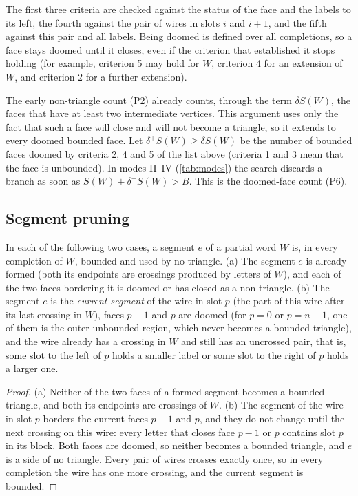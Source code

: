 The first three criteria are checked against the status of the face and the labels to its left, the fourth against the pair of wires in slots $i$ and $i+1$, and the fifth against this pair and all labels.
Being doomed is defined over all completions, so a face stays doomed until it closes, even if the criterion that established it stops holding (for example, criterion 5 may hold for $W$, criterion 4 for an extension of $W$, and criterion 2 for a further extension).

The early non-triangle count (P2) already counts, through the term $\delta S(W)$, the faces that have at least two intermediate vertices.
This argument uses only the fact that such a face will close and will not become a triangle, so it extends to every doomed bounded face.
Let $\delta^+S(W)\ge\delta S(W)$ be the number of bounded faces doomed by criteria 2, 4 and 5 of the list above (criteria 1 and 3 mean that the face is unbounded).
In modes II--IV (\cref{tab:modes}) the search discards a branch as soon as $S(W)+\delta^+S(W)>B$. This is the doomed-face count (P6).

\subsection{Segment pruning}

\begin{lemma}\label{lem:early-count}
In each of the following two cases, a segment $e$ of a partial word $W$ is, in every completion of $W$, bounded and used by no triangle.
(a) The segment $e$ is already formed (both its endpoints are crossings produced by letters of $W$), and each of the two faces bordering it is doomed or has closed as a non-triangle.
(b) The segment $e$ is the \emph{current segment} of the wire in slot $p$ (the part of this wire after its last crossing in $W$), faces $p-1$ and $p$ are doomed (for $p=0$ or $p=n-1$, one of them is the outer unbounded region, which never becomes a bounded triangle), and the wire already has a crossing in $W$ and still has an uncrossed pair, that is, some slot to the left of $p$ holds a smaller label or some slot to the right of $p$ holds a larger one.
\end{lemma}

\begin{proof}
(a) Neither of the two faces of a formed segment becomes a bounded triangle, and both its endpoints are crossings of $W$.
(b) The segment of the wire in slot $p$ borders the current faces $p-1$ and $p$, and they do not change until the next crossing on this wire: every letter that closes face $p-1$ or $p$ contains slot $p$ in its block.
Both faces are doomed, so neither becomes a bounded triangle, and $e$ is a side of no triangle.
Every pair of wires crosses exactly once, so in every completion the wire has one more crossing, and the current segment is bounded.
\end{proof}

